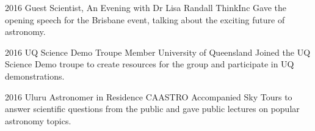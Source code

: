 \begin{entrylist}
\entry
    {2016}
    {Guest Scientist, An Evening with Dr Lisa Randall}
    {ThinkInc}
    {Gave the opening speech for the Brisbane event, talking about the exciting future of astronomy.}
\end{entrylist}
\begin{entrylist}
\entry
    {2016}
    {UQ Science Demo Troupe Member}
    {University of Queensland}
    {Joined the UQ Science Demo troupe to create resources for the group and participate in UQ demonstrations.}
\end{entrylist}
\begin{entrylist}
\entry
    {2016}
    {Uluru Astronomer in Residence}
    {CAASTRO}
    {Accompanied Sky Tours to answer scientific questions from the public and gave public lectures on popular astronomy topics.}
\end{entrylist}


